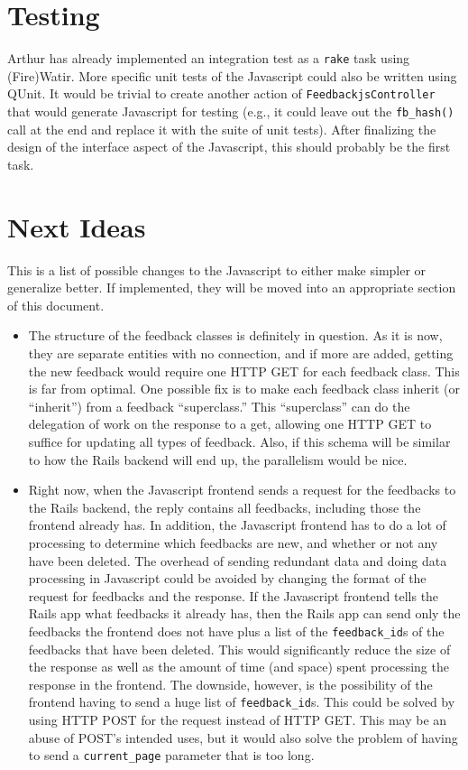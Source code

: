 \documentclass[letterpaper,12pt]{article}
\newcommand{\fbhash}[1]{\texttt{fb\_hash#1}}
\newcommand{\code}[1]{{\tt #1}}
\begin{document}
\section{Testing}
\label{sec:Testing}
Arthur has already implemented an integration test as a \code{rake} task using (Fire)Watir.  More specific unit tests of the Javascript could also be written using QUnit.  It would be trivial to create another action of \code{FeedbackjsController} that would generate Javascript for testing (e.g., it could leave out the \fbhash{()} call at the end and replace it with the suite of unit tests).  After finalizing the design of the interface aspect of the Javascript, this should probably be the first task.

\section{Next Ideas}
\label{sec:Next Ideas}
This is a list of possible changes to the Javascript to either make simpler or generalize better.  If implemented, they will be moved into an appropriate section of this document.
\begin{itemize}
 \item The structure of the feedback classes is definitely in question.  As it is now, they are separate entities with no connection, and if more are added, getting the new feedback would require one HTTP GET for each feedback class.  This is far from optimal.  One possible fix is to make each feedback class inherit (or ``inherit'') from a feedback ``superclass.'' This ``superclass'' can do the delegation of work on the response to a get, allowing one HTTP GET to suffice for updating all types of feedback.  Also, if this schema will be similar to how the Rails backend will end up, the parallelism would be nice.
 \item Right now, when the Javascript frontend sends a request for the feedbacks to the Rails backend, the reply contains all feedbacks, including those the frontend already has.  In addition, the Javascript frontend has to do a lot of processing to determine which feedbacks are new, and whether or not any have been deleted.  The overhead of sending redundant data and doing data processing in Javascript could be avoided by changing the format of the request for feedbacks and the response.  If the Javascript frontend tells the Rails app what feedbacks it already has, then the Rails app can send only the feedbacks the frontend does not have plus a list of the \code{feedback\_id}s of the feedbacks that have been deleted.  This would significantly reduce the size of the response as well as the amount of time (and space) spent processing the response in the frontend.  The downside, however, is the possibility of the frontend having to send a huge list of \code{feedback\_id}s.  This could be solved by using HTTP POST for the request instead of HTTP GET.  This may be an abuse of POST's intended uses, but it would also solve the problem of having to send a \code{current\_page} parameter that is too long.
\end{itemize}
\end{document}
